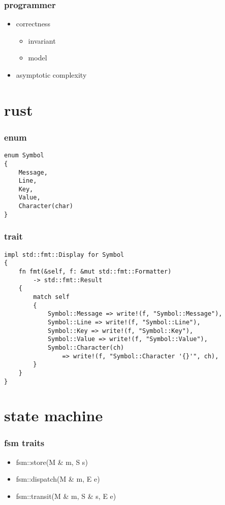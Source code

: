 \documentclass{beamer}
\begin{document}
\begin{frame}
    \frametitle{programmer}
    \begin{itemize}
        \item correctness
        \begin{itemize}
            \item invariant
            \item model
        \end{itemize}
        \item asymptotic complexity
    \end{itemize}
\end{frame}

\section{rust}

\begin{frame}[fragile]
    \frametitle{enum}
    \begin{verbatim}
enum Symbol
{
    Message,
    Line,
    Key,
    Value,
    Character(char)
}
    \end{verbatim}
\end{frame}

\begin{frame}[fragile]
    \frametitle{trait}
    \small
    \begin{verbatim}
impl std::fmt::Display for Symbol
{
    fn fmt(&self, f: &mut std::fmt::Formatter)
        -> std::fmt::Result
    {
        match self
        {
            Symbol::Message => write!(f, "Symbol::Message"),
            Symbol::Line => write!(f, "Symbol::Line"),
            Symbol::Key => write!(f, "Symbol::Key"),
            Symbol::Value => write!(f, "Symbol::Value"),
            Symbol::Character(ch)
                => write!(f, "Symbol::Character '{}'", ch),
        }
    }
}
    \end{verbatim}
\end{frame}

\section{state machine}

\begin{frame}
    \frametitle{fsm traits}
    \begin{itemize}
        \item fsm::store(M \& m, S s)
        \item fsm::dispatch(M \& m, E e)
        \item fsm::transit(M \& m, S \& s, E e)
    \end{itemize}
\end{frame}
\end{document}
